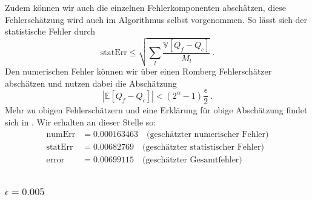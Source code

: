 Zudem können wir auch die einzelnen Fehlerkomponenten abschätzen, diese Fehlerschätzung wird auch im Algorithmus selbst vorgenommen. So lässt sich der statistische Fehler durch \[
\text{statErr} \leq \sqrt{\sum_l   \frac{\mathbb{V}[Q_f-Q_c]}{M_l}} \ . \] 
Den numerischen Fehler können wir über einen Romberg Fehlerschätzer abschätzen und nutzen dabei die Abschätzung \[ \left| \mathbb{E}[Q_f-Q_c] \right| < (2^{\alpha}-1)\frac{\epsilon}{2} \ . \] Mehr zu obigen Fehlerschätzern und eine Erklärung für obige Abschätzung findet sich in \cite{giles_2015}.
Wir erhalten an dieser Stelle so: 
\begin{align*}
\text{numErr}  &=  0.000163463   \quad \text{(geschätzter numerischer Fehler)}\\
\text{statErr} &= 0.00682769  \quad  \text{(geschätzter statistischer Fehler)}\\
\text{error}   &= 0.00699115   \quad  \text{(geschätzter Gesamtfehler)}\\
\end{align*}



\subsubsection{$ \epsilon=0.005 $}

